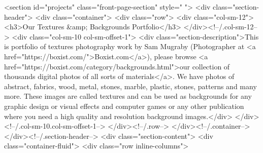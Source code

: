 <section id="projects" class="front-page-section" style="
">
			<div class="section-header">
			<div class="container">
				<div class="row">
											<div class="col-sm-12">
							<h3>Our Textures &amp; Backgrounds Portfolio</h3>
						</div><!--/.col-sm-12-->
																<div class="col-sm-10 col-sm-offset-1">
							<div class="section-description">This is portfolio of textures photography work by Sam Mugraby (Photographer at <a href="https://boxist.com/">Boxist.com</a>), please browse <a href="https://boxist.com/category/backgrounds.html">our collection of thousands digital photos of all sorts of materials</a>. We have photos of abstract, fabrics, wood, metal, stones, marble, plastic, stones, patterns and many more. These images are called textures and can be used as backgrounds for any graphic design or visual effects and computer games or any other publication where you need a high quality and resolution background images.</div>
						</div><!--/.col-sm-10.col-sm-offset-1-->
									</div><!--/.row-->
			</div><!--/.container-->
		</div><!--/.section-header-->
		<div class="section-content">
		<div class="container-fluid">
			<div class="row inline-columns">
